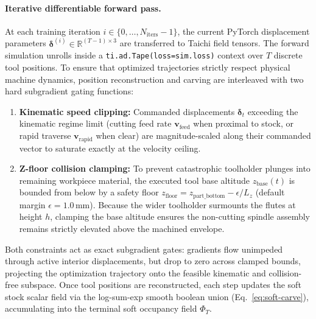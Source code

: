 \paragraph{Iterative differentiable forward pass.}
At each training iteration $i \in \{0, \dots, N_{\mathrm{iters}}-1\}$, the current PyTorch displacement parameters $\boldsymbol{\delta}^{(i)} \in \mathbb{R}^{(T-1) \times 3}$ are transferred to Taichi field tensors. The forward simulation unrolls inside a \texttt{ti.ad.Tape(loss=sim.loss)} context over $T$ discrete tool positions. To ensure that optimized trajectories strictly respect physical machine dynamics, position reconstruction and carving are interleaved with two hard subgradient gating functions:
\begin{enumerate}\itemsep0pt
  \item \textbf{Kinematic speed clipping:} Commanded displacements $\boldsymbol{\delta}_t$ exceeding the kinematic regime limit (cutting feed rate $\mathbf{v}_{\mathrm{feed}}$ when proximal to stock, or rapid traverse $\mathbf{v}_{\mathrm{rapid}}$ when clear) are magnitude-scaled along their commanded vector to saturate exactly at the velocity ceiling.
  \item \textbf{Z-floor collision clamping:} To prevent catastrophic toolholder plunges into remaining workpiece material, the executed tool base altitude $z_{\mathrm{base}}(t)$ is bounded from below by a safety floor $z_{\mathrm{floor}} = z_{\mathrm{part\_bottom}} - \epsilon / L_z$ (default margin $\epsilon = 1.0\,\mathrm{mm}$). Because the wider toolholder surmounts the flutes at height $h$, clamping the base altitude ensures the non-cutting spindle assembly remains strictly elevated above the machined envelope.
\end{enumerate}
Both constraints act as exact subgradient gates: gradients flow unimpeded through active interior displacements, but drop to zero across clamped bounds, projecting the optimization trajectory onto the feasible kinematic and collision-free subspace. Once tool positions are reconstructed, each step updates the soft stock scalar field via the log-sum-exp smooth boolean union (Eq.~\ref{eq:soft-carve}), accumulating into the terminal soft occupancy field $\Phi_T$.

